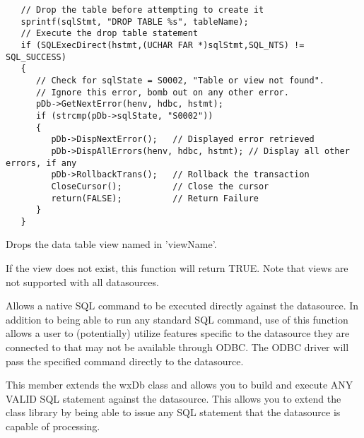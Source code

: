 
\begin{verbatim}
   // Drop the table before attempting to create it
   sprintf(sqlStmt, "DROP TABLE %s", tableName);
   // Execute the drop table statement
   if (SQLExecDirect(hstmt,(UCHAR FAR *)sqlStmt,SQL_NTS) != SQL_SUCCESS)
   {
      // Check for sqlState = S0002, "Table or view not found".
      // Ignore this error, bomb out on any other error.
      pDb->GetNextError(henv, hdbc, hstmt);
      if (strcmp(pDb->sqlState, "S0002"))
      {
         pDb->DispNextError();   // Displayed error retrieved
         pDb->DispAllErrors(henv, hdbc, hstmt); // Display all other errors, if any
         pDb->RollbackTrans();   // Rollback the transaction
         CloseCursor();          // Close the cursor
         return(FALSE);          // Return Failure
      }
   }
\end{verbatim}


\label{wxdbdropview}


Drops the data table view named in 'viewName'.




If the view does not exist, this function will return TRUE.  Note that views are not supported with all datasources.

\label{wxdbexecsql}


Allows a native SQL command to be executed directly against the datasource.  In addition to being able to run any standard SQL command, use of this function allows a user to (potentially) utilize features specific to the datasource they are connected to that may not be available through ODBC.  The ODBC driver will pass the specified command directly to the datasource.




This member extends the wxDb class and allows you to build and execute ANY VALID
SQL statement against the datasource.  This allows you to extend the class 
library by being able to issue any SQL statement that the datasource is capable
of processing.

